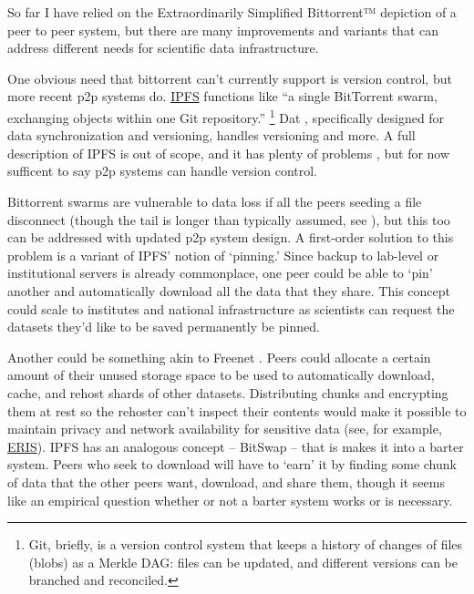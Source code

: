 \documentclass[10pt]{tufte-book}
\begin{document}
So far I have relied on the Extraordinarily Simplified Bittorrent™
depiction of a peer to peer system, but there are many improvements and
variants that can address different needs for scientific data
infrastructure.

One obvious need that bittorrent can't currently support is version
control, but more recent p2p systems do. \href{https://ipfs.io/}{IPFS}
functions like ``a single BitTorrent swarm, exchanging objects within
one Git repository.'' \citep{benetIPFSContentAddressed2014} \footnote{Git, briefly, is a version control system that keeps a
  history of changes of files (blobs) as a Merkle DAG: files can be
  updated, and different versions can be branched and reconciled.} Dat
\citep{ogdenDatDistributedDataset2017} , specifically designed for
data synchronization and versioning, handles versioning and more. A full
description of IPFS is out of scope, and it has plenty of problems \citep{patsakisHydrasIPFSDecentralised2019} , but for now sufficent to
say p2p systems can handle version control.

Bittorrent swarms are vulnerable to data loss if all the peers seeding a
file disconnect (though the tail is longer than typically assumed, see
\citep{zhangUnravelingBitTorrentEcosystem2011} ), but this too can
be addressed with updated p2p system design. A first-order solution to
this problem is a variant of IPFS' notion of `pinning.' Since backup to
lab-level or institutional servers is already commonplace, one peer
could be able to `pin' another and automatically download all the data
that they share. This concept could scale to institutes and national
infrastructure as scientists can request the datasets they'd like to be
saved permanently be pinned.

Another could be something akin to Freenet \citep{clarkeFreenetDistributedAnonymous2001} . Peers could allocate a
certain amount of their unused storage space to be used to automatically
download, cache, and rehost shards of other datasets. Distributing
chunks and encrypting them at rest so the rehoster can't inspect their
contents would make it possible to maintain privacy and network
availability for sensitive data (see, for example,
\href{https://inqlab.net/projects/eris/}{ERIS}). IPFS has an analogous
concept -- BitSwap -- that is makes it into a barter system. Peers who
seek to download will have to `earn' it by finding some chunk of data
that the other peers want, download, and share them, though it seems
like an empirical question whether or not a barter system works or is
necessary.
\end{document}
